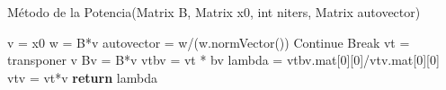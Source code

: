 
\begin{algorithm}[H]
\caption{Método de la Potencia(Matrix B, Matrix x0, int niters, Matrix autovector)}
\label{pseudo:Metodo de la potencia}
\begin{algorithmic}

\STATE v = x0
	\STATE w = B*v
	\STATE autovector = w/(w.normVector())
		\STATE Continue
	\ELSE
		\STATE Break
	\ENDIF
\ENDFOR
\STATE vt = transponer v
\STATE Bv = B*v
\STATE vtbv = vt * bv
\STATE lambda = vtbv.mat[0][0]/vtv.mat[0][0]
\STATE vtv = vt*v
\STATE \textbf{return} lambda
\end{algorithmic}
\end{algorithm}
